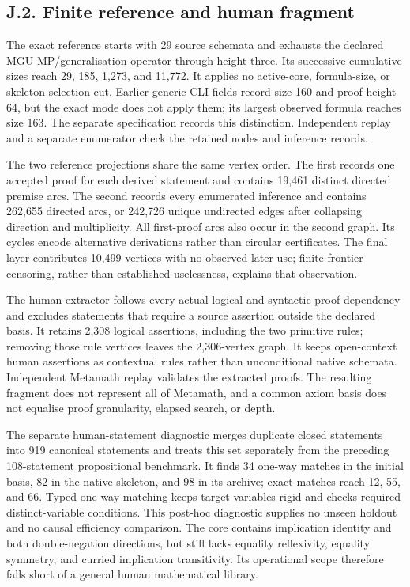 \documentclass[pdflatex,sn-basic,Numbered]{sn-jnl}
\begin{document}
\subsection*{J.2. Finite reference and human fragment}\label{j.2.-finite-reference-and-human-fragment}

The exact reference starts with 29 source schemata and exhausts the declared MGU-MP/generalisation operator through height three. Its successive cumulative sizes reach 29, 185, 1,273, and 11,772. It applies no active-core, formula-size, or skeleton-selection cut. Earlier generic CLI fields record size 160 and proof height 64, but the exact mode does not apply them; its largest observed formula reaches size 163. The separate specification records this distinction. Independent replay and a separate enumerator check the retained nodes and inference records.

The two reference projections share the same vertex order. The first records one accepted proof for each derived statement and contains 19,461 distinct directed premise arcs. The second records every enumerated inference and contains 262,655 directed arcs, or 242,726 unique undirected edges after collapsing direction and multiplicity. All first-proof arcs also occur in the second graph. Its cycles encode alternative derivations rather than circular certificates. The final layer contributes 10,499 vertices with no observed later use; finite-frontier censoring, rather than established uselessness, explains that observation.

The human extractor follows every actual logical and syntactic proof dependency and excludes statements that require a source assertion outside the declared basis. It retains 2,308 logical assertions, including the two primitive rules; removing those rule vertices leaves the 2,306-vertex graph. It keeps open-context human assertions as contextual rules rather than unconditional native schemata. Independent Metamath replay validates the extracted proofs. The resulting fragment does not represent all of Metamath, and a common axiom basis does not equalise proof granularity, elapsed search, or depth.

The separate human-statement diagnostic merges duplicate closed statements into 919 canonical statements and treats this set separately from the preceding 108-statement propositional benchmark. It finds 34 one-way matches in the initial basis, 82 in the native skeleton, and 98 in its archive; exact matches reach 12, 55, and 66. Typed one-way matching keeps target variables rigid and checks required distinct-variable conditions. This post-hoc diagnostic supplies no unseen holdout and no causal efficiency comparison. The core contains implication identity and both double-negation directions, but still lacks equality reflexivity, equality symmetry, and curried implication transitivity. Its operational scope therefore falls short of a general human mathematical library.
\end{document}
